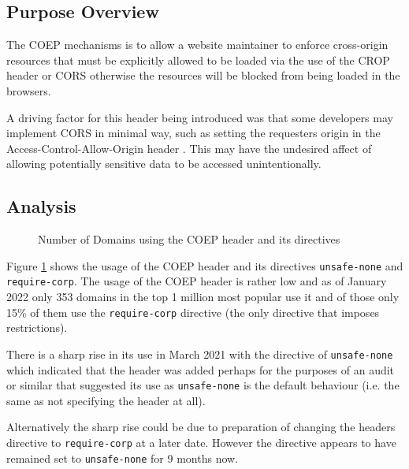 \documentclass{mscreport}
\begin{document}
\subsection{Purpose Overview}

\noindent
The COEP mechanisms is to allow a website maintainer to enforce cross-origin resources that must be explicitly allowed to be loaded via the use of the CROP header or CORS otherwise the resources will be blocked from being loaded in the browsers.

\vspace{0.3cm} \noindent
A driving factor for this header being introduced was that some developers may implement CORS in minimal way, such as setting the requesters origin in the Access-Control-Allow-Origin header \cite{noauthor_undated-cr}. This may have the undesired affect of allowing potentially sensitive data to be accessed unintentionally.


\subsection{Analysis}

\begin{figure}[t]
	\begin{center}
		\caption{Number of Domains using the COEP header and its directives}
		\label{fig:coep_overview}
	\end{center}
\end{figure}

\noindent
Figure \ref{fig:coep_overview} shows the usage of the COEP header and its directives \texttt{unsafe-none} and \texttt{require-corp}. The usage of the COEP header is rather low and as of January 2022 only 353 domains in the top 1 million most popular use it and of those only 15\% of them use the \texttt{require-corp} directive (the only directive that imposes restrictions).

\vspace{0.3cm} \noindent
There is a sharp rise in its use in March 2021 with the directive of \texttt{unsafe-none} which indicated that the header was added perhaps for the purposes of an audit or similar that suggested its use as \texttt{unsafe-none} is the default behaviour (i.e. the same as not specifying the header at all).

\vspace{0.3cm} \noindent
Alternatively the sharp rise could be due to preparation of changing the headers directive to \texttt{require-corp} at a later date. However the directive appears to have remained set to \texttt{unsafe-none} for 9 months now.
\end{document}
